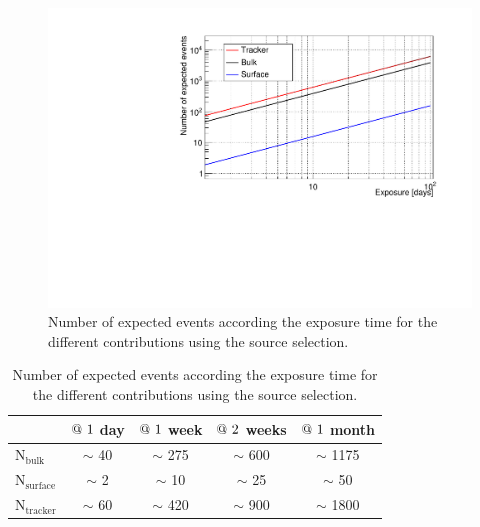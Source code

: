 \documentclass[main.tex]{subfiles}
\begin{document}
\begin{figure}[h!]
\begin{center}
\includegraphics[scale=0.6]{pictures/Chap5/nexpected_source_selection.pdf}
\caption{Number of expected events according the exposure time for the different contributions using the source selection.}
\label{picture_number_of_expected_events_source_selection}
\end{center}
\end{figure}


\begin{table}[h!]
\begin{center}
\begin{tabular}{l|c|c|c|c}
 & $\symbol{64}~1$ day  & $\symbol{64}~1$ week  & $\symbol{64}~2$ weeks & $\symbol{64}~1$ month  \\
\hline
$\text{N}_\text{bulk}$    & $\sim$ 40 & $\sim$ 275  & $\sim$ 600 & $\sim$ 1175 \\
$\text{N}_\text{surface}$ & $\sim$ 2  & $\sim$ 10   & $\sim$ 25  & $\sim$ 50   \\
$\text{N}_\text{tracker}$ & $\sim$ 60 & $\sim$ 420  & $\sim$ 900 & $\sim$ 1800 \\
\hline
\end{tabular}
\end{center}
\caption{Number of expected events according the exposure time for the different contributions using the source selection.}
\label{table_number_of_expected_events_source_selection}
\end{table}
\end{document}
